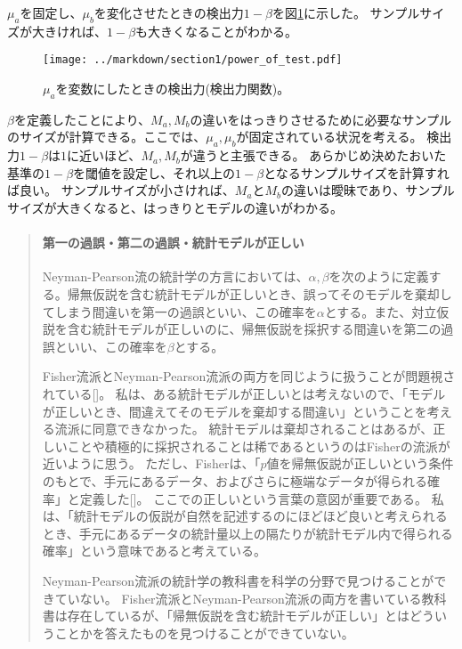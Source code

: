 \documentclass[a4paper,11pt,dvipdfmx]{jsarticle}
\begin{document}
$\mu_a$を固定し、$\mu_b$を変化させたときの検出力$1-\beta$を図\ref{fig:power_of_test_N_mu0_variable}に示した。
サンプルサイズが大きければ、$1-\beta$も大きくなることがわかる。

\begin{figure}
    \begin{center}
        \texttt{[image: ../markdown/section1/power\_of\_test.pdf]}
        \label{fig:power_of_test_N_mu0_variable}
        \caption{$\mu_a$を変数にしたときの検出力(検出力関数)。}
    \end{center}
\end{figure}

$\beta$を定義したことにより、$M_a,M_b$の違いをはっきりさせるために必要なサンプルのサイズが計算できる。ここでは、$\mu_a,\mu_b$が固定されている状況を考える。
検出力$1-\beta$は$1$に近いほど、$M_a,M_b$が違うと主張できる。
あらかじめ決めたおいた基準の$1-\beta$を閾値を設定し、それ以上の$1-\beta$となるサンプルサイズを計算すれば良い。
サンプルサイズが小さければ、$M_a$と$M_b$の違いは曖昧であり、サンプルサイズが大きくなると、はっきりとモデルの違いがわかる。



\begin{mybox}
    \begin{quote}
    \paragraph{第一の過誤・第二の過誤・統計モデルが正しい}
        Neyman-Pearson流の統計学の方言においては、$\alpha,\beta$を次のように定義する。帰無仮説を含む統計モデルが正しいとき、誤ってそのモデルを棄却してしまう間違いを第一の過誤といい、この確率を$\alpha$とする。また、対立仮説を含む統計モデルが正しいのに、帰無仮説を採択する間違いを第二の過誤といい、この確率を$\beta$とする。

        Fisher流派とNeyman-Pearson流派の両方を同じように扱うことが問題視されている[\cite{published_papers/18436201}]。
        私は、ある統計モデルが正しいとは考えないので、「モデルが正しいとき、間違えてそのモデルを棄却する間違い」ということを考える流派に同意できなかった。
        統計モデルは棄却されることはあるが、正しいことや積極的に採択されることは稀であるというのはFisherの流派が近いように思う。
        ただし、Fisherは、「$p$値を帰無仮説が正しいという条件のもとで、手元にあるデータ、およびさらに極端なデータが得られる確率」と定義した[\cite{1573106361610039296}]。
        ここでの正しいという言葉の意図が重要である。
        私は、「統計モデルの仮説が自然を記述するのにほどほど良いと考えられるとき、手元にあるデータの統計量以上の隔たりが統計モデル内で得られる確率」という意味であると考えている。

        Neyman-Pearson流派の統計学の教科書を科学の分野で見つけることができていない。
        Fisher流派とNeyman-Pearson流派の両方を書いている教科書は存在しているが、「帰無仮説を含む統計モデルが正しい」とはどういうことかを答えたものを見つけることができていない。
    \end{quote}
\end{mybox}
\end{document}
